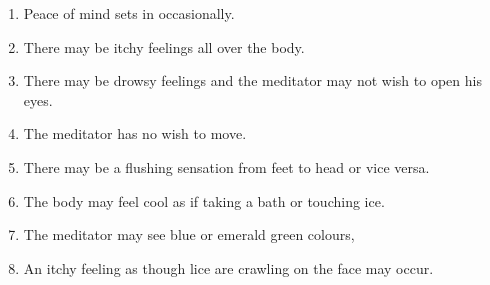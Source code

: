 \documentclass[a5paper,10pt,english]{book}
\begin{document}
\begin{enumerate}
\begin{enumerate}
\item {} 
\sphinxAtStartPar
Peace of mind sets in occasionally.

\item {} 
\sphinxAtStartPar
There may be itchy feelings all over the body.

\item {} 
\sphinxAtStartPar
There may be drowsy feelings and the meditator may not wish to open his eyes.

\item {} 
\sphinxAtStartPar
The meditator has no wish to move.

\item {} 
\sphinxAtStartPar
There may be a flushing sensation from feet to head or vice versa.

\item {} 
\sphinxAtStartPar
The body may feel cool as if taking a bath or touching ice.

\item {} 
\sphinxAtStartPar
The meditator may see blue or emerald green colours,

\item {} 
\sphinxAtStartPar
An itchy feeling as though lice are crawling on the face may occur.

\end{enumerate}

\end{enumerate}

\sphinxAtStartPar
{}
\end{document}
